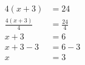 \documentclass[varwidth]{standalone}
\begin{document}
    \begin{varwidth}{0.25\paperwidth}
    \begin{align*}
    4(x + 3) &= 24\\
    \frac{4(x+3)}{4} &= \frac{24}{4}\\
    x + 3 &= 6\\
    x + 3 - 3 &= 6 - 3\\
    x &= 3\\
\end{align*}
\end{varwidth}
\end{document}
